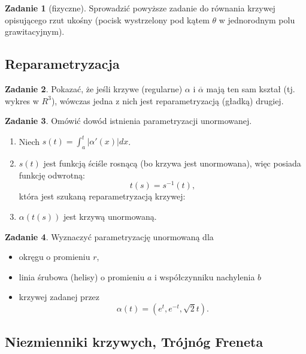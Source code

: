 \documentclass[a4paper,11pt]{article}
\theoremstyle{definition}\newtheorem{exercise}{Zadanie}
\theoremstyle{definition}\newtheorem{remark}{Uwaga}
\begin{document}
\begin{exercise}[fizyczne]
Sprowadzić powyższe zadanie do r\'ownania krzywej opisującego rzut ukośny 
(pocisk wystrzelony pod kątem $\theta$ w jednorodnym polu grawitacyjnym).
\end{exercise}

\subsection{Reparametryzacja}

\begin{exercise}
Pokazać, że jeśli krzywe (regularne) $\alpha$ i $\overline{\alpha}$ mają ten 
sam kształ (tj. wykres w $R^3$), w\'owczas jedna z nich jest 
reparametryzacją (gładką) drugiej.
\end{exercise}

\begin{exercise}
Omówić dowód istnienia parametryzacji unormowanej.
\begin{enumerate}
 \item Niech $s(t)=\int_{a}^t|\alpha'(x)|dx$.
\item $s(t)$ jest funkcją ściśle rosnącą (bo krzywa jest unormowana), więc 
posiada funkcję odwrotną:\[t(s)=s^{-1}(t),\] która jest szukaną 
reparametryzacją krzywej:
\item $\alpha(t(s))$ jest krzywą unormowaną.
\end{enumerate}
\end{exercise}

\begin{exercise}
Wyznaczyć parametryzację unormowaną dla
\begin{itemize}
\item okręgu o promieniu $r$,
\item linia śrubowa (helisy) o promieniu $a$ i współczynniku nachylenia $b$
\item krzywej zadanej przez \[\alpha(t)=\left(e^t,e^{-t},\sqrt{2}t\right).\]
\end{itemize}
\end{exercise}


\subsection{Niezmienniki krzywych, Tr\'ojn\'og Freneta}
\end{document}
